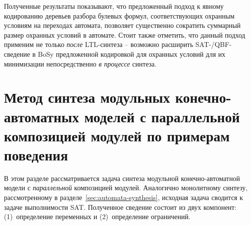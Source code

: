 Полученные результаты показывают, что предложенный подход к явному кодированию деревьев разбора булевых формул, соответствующих охранным условиям на переходах автомата, позволяет существенно сократить суммарный размер охранных условий в автомате.
Стоит также отметить, что данный подход применим не только \emph{после} LTL-синтеза \--- возможно расширить SAT-/QBF-сведение в BoSy предложенной кодировкой для охранных условий для их минимизации непосредственно \emph{в процессе} синтеза.






% 


\section{Метод синтеза модульных конечно-автоматных моделей с параллельной композицией модулей по примерам поведения}
\label{sec:modular-synthesis-parallel}

В этом разделе рассматривается задача синтеза модульной конечно-автоматной модели с \textit{параллельной} композицией модулей.
Аналогично монолитному синтезу, рассмотренному в разделе~\ref{sec:automata-synthesis}, исходная задача сводится к задаче выполнимости SAT.
Полученное сведение состоит из двух компонент: (1)~определение переменных и (2)~определение ограничений.


